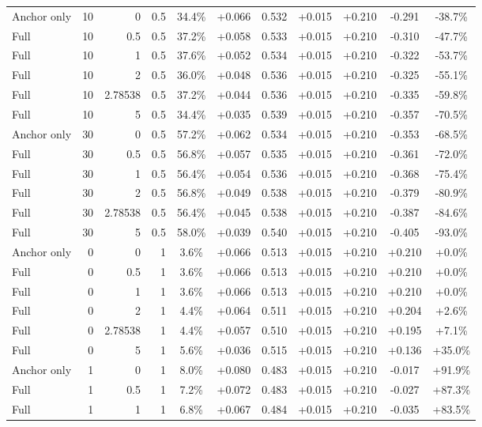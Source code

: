 \begin{table}[htbp]
\begin{tabular}{lrrrccccccc}
Anchor only & 10 & 0 & 0.5 & 34.4\% & +0.066 & 0.532 & +0.015 & +0.210 & -0.291 & -38.7\% \\
Full & 10 & 0.5 & 0.5 & 37.2\% & +0.058 & 0.533 & +0.015 & +0.210 & -0.310 & -47.7\% \\
Full & 10 & 1 & 0.5 & 37.6\% & +0.052 & 0.534 & +0.015 & +0.210 & -0.322 & -53.7\% \\
Full & 10 & 2 & 0.5 & 36.0\% & +0.048 & 0.536 & +0.015 & +0.210 & -0.325 & -55.1\% \\
Full & 10 & 2.78538 & 0.5 & 37.2\% & +0.044 & 0.536 & +0.015 & +0.210 & -0.335 & -59.8\% \\
Full & 10 & 5 & 0.5 & 34.4\% & +0.035 & 0.539 & +0.015 & +0.210 & -0.357 & -70.5\% \\
Anchor only & 30 & 0 & 0.5 & 57.2\% & +0.062 & 0.534 & +0.015 & +0.210 & -0.353 & -68.5\% \\
Full & 30 & 0.5 & 0.5 & 56.8\% & +0.057 & 0.535 & +0.015 & +0.210 & -0.361 & -72.0\% \\
Full & 30 & 1 & 0.5 & 56.4\% & +0.054 & 0.536 & +0.015 & +0.210 & -0.368 & -75.4\% \\
Full & 30 & 2 & 0.5 & 56.8\% & +0.049 & 0.538 & +0.015 & +0.210 & -0.379 & -80.9\% \\
Full & 30 & 2.78538 & 0.5 & 56.4\% & +0.045 & 0.538 & +0.015 & +0.210 & -0.387 & -84.6\% \\
Full & 30 & 5 & 0.5 & 58.0\% & +0.039 & 0.540 & +0.015 & +0.210 & -0.405 & -93.0\% \\
Anchor only & 0 & 0 & 1 & 3.6\% & +0.066 & 0.513 & +0.015 & +0.210 & +0.210 & +0.0\% \\
Full & 0 & 0.5 & 1 & 3.6\% & +0.066 & 0.513 & +0.015 & +0.210 & +0.210 & +0.0\% \\
Full & 0 & 1 & 1 & 3.6\% & +0.066 & 0.513 & +0.015 & +0.210 & +0.210 & +0.0\% \\
Full & 0 & 2 & 1 & 4.4\% & +0.064 & 0.511 & +0.015 & +0.210 & +0.204 & +2.6\% \\
Full & 0 & 2.78538 & 1 & 4.4\% & +0.057 & 0.510 & +0.015 & +0.210 & +0.195 & +7.1\% \\
Full & 0 & 5 & 1 & 5.6\% & +0.036 & 0.515 & +0.015 & +0.210 & +0.136 & +35.0\% \\
Anchor only & 1 & 0 & 1 & 8.0\% & +0.080 & 0.483 & +0.015 & +0.210 & -0.017 & +91.9\% \\
Full & 1 & 0.5 & 1 & 7.2\% & +0.072 & 0.483 & +0.015 & +0.210 & -0.027 & +87.3\% \\
Full & 1 & 1 & 1 & 6.8\% & +0.067 & 0.484 & +0.015 & +0.210 & -0.035 & +83.5\% \\

\end{tabular}
\end{table}
